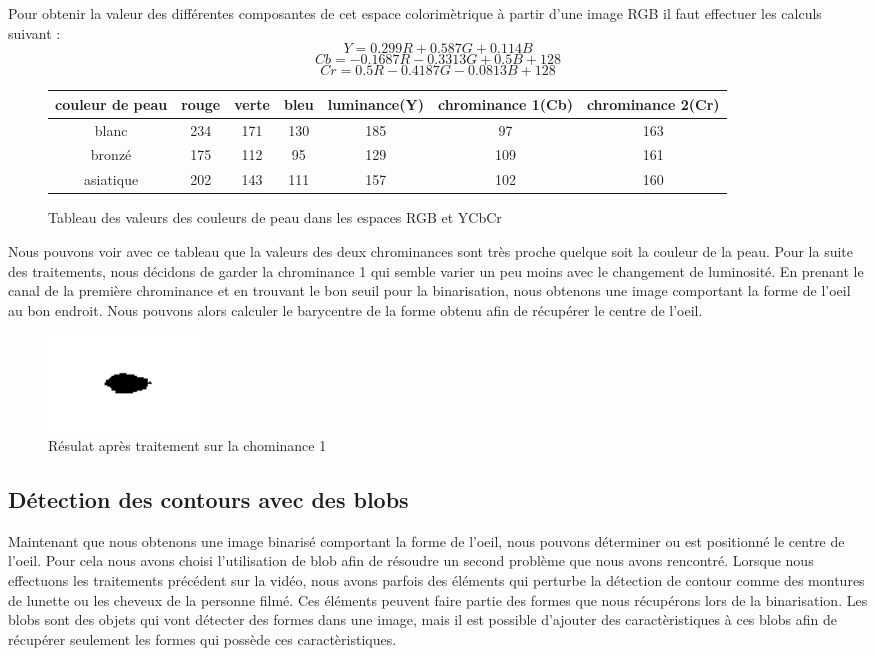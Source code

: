 Pour obtenir la valeur des différentes composantes de cet espace colorimètrique à partir
d'une image RGB il faut effectuer les calculs suivant :
$$Y = 0.299R + 0.587 G + 0.114 B$$
$$Cb = -0.1687R - 0.3313 G + 0.5B + 128$$
$$Cr = 0.5R -0.4187G -0.0813B + 128$$

\begin{figure}[H]
 \begin{tabular}{|c|c|c|c|c|c|c|}
  \hline
  couleur de peau & rouge & verte & bleu & luminance(Y) & chrominance 1(Cb) & chrominance 2(Cr)\\
  \hline
  blanc & 234 & 171 & 130 & 185 & 97 & 163 \\
  \hline
  bronzé & 175 & 112 & 95 & 129 & 109 & 161 \\
  \hline
  asiatique & 202 & 143 & 111 & 157 & 102 & 160\\
  \hline
 \end{tabular}
 \caption{Tableau des valeurs des couleurs de peau dans les espaces RGB et YCbCr}
\end{figure}

Nous pouvons voir avec ce tableau que la valeurs des deux chrominances sont très proche quelque soit
la couleur de la peau. Pour la suite des traitements, nous décidons de garder la chrominance 1 qui semble
varier un peu moins avec le changement de luminosité. En prenant le canal de la première chrominance et en 
trouvant le bon seuil pour la binarisation, nous obtenons une image comportant la forme de l'oeil au bon endroit.
Nous pouvons alors calculer le barycentre de la forme obtenu afin de récupérer le centre de l'oeil.

\begin{figure}[H]
 \center
 \includegraphics[width=4cm]{image/pupille.png}
 \caption{Résulat après traitement sur la chominance 1}
\end{figure}

\subsection{Détection des contours avec des blobs}
Maintenant que nous obtenons une image binarisé comportant la forme de l'oeil, nous pouvons déterminer ou est
positionné le centre de l'oeil. Pour cela nous avons choisi l'utilisation de blob afin de résoudre un second 
problème que nous avons rencontré. Lorsque nous effectuons les traitements précédent sur la vidéo, nous avons
parfois des éléments qui perturbe la détection de contour comme des montures de lunette ou les cheveux de la personne 
filmé. Ces éléments peuvent faire partie des formes que nous récupérons lors de la binarisation. Les blobs
sont des objets qui vont détecter des formes dans une image, mais il est possible d'ajouter des caractèristiques
à ces blobs afin de récupérer seulement les formes qui possède ces caractèristiques.\\

